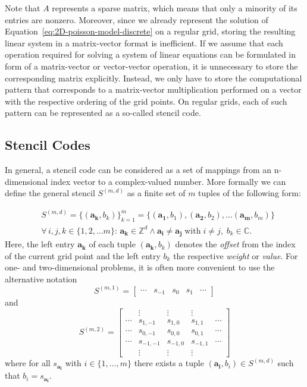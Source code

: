 Note that $A$ represents a sparse matrix, which means that only a minority of its entries are nonzero.
Moreover, since we already represent the solution of Equation~\ref{eq:2D-poisson-model-discrete} on a regular grid, storing the resulting linear system in a matrix-vector format is inefficient.
If we assume that each operation required for solving a system of linear equations can be formulated in form of a matrix-vector or vector-vector operation, it is unnecessary to store the corresponding matrix explicitly.
Instead, we only have to store the computational pattern that corresponds to a matrix-vector multiplication performed on a vector with the respective ordering of the grid points.
On regular grids, each of such pattern can be represented as a so-called stencil code.
\subsection{Stencil Codes}
\label{subsec:stencil-codes}
In general, a stencil code can be considered as a set of mappings from an n-dimensional index vector to a complex-valued number.
More formally we can define the general stencil $S^{(m,d)}$ as a finite set of $m$ tuples of the following form:

\begin{equation}
	\begin{split}
			& S^{(m, d)} = \{(\bm{a_k}, b_k) \}_{k=1}^m = \{(\bm{a_1}, b_1),  (\bm{a_2}, b_2), \dots (\bm{a_m}, b_m)\} 
	\\ & \forall \, i, j, k \in \{1, 2, \dots m \}: \,
	\bm{a_k} \in \mathbb{Z}^d \wedge \bm{a_i} \neq \bm{a_j} \; \text{with} \; i \neq j, \; b_k \in \mathbb{C}.
	\end{split}
\end{equation}
Here, the left entry $\bm{a_k}$ of each tuple $(\bm{a_k}, b_k)$ denotes the \emph{offset} from the index of the current grid point and the left entry $b_k$ the respective \emph{weight} or \emph{value}.
For one- and two-dimensional problems, it is often more convenient to use the alternative notation 
\begin{equation*}
	S^{(m, 1)} = \begin{bmatrix}
		\cdots & s_{-1} & s_{0} & s_{1} & \cdots
	\end{bmatrix}
\end{equation*}
and
\begin{equation*}
	S^{(m, 2)} = \begin{bmatrix}
		& \vdots & \vdots & \vdots & \\
		\cdots & s_{1,-1} & s_{1,0} & s_{1,1} & \cdots \\
		\cdots & s_{0,-1} & s_{0,0} & s_{0,1} & \cdots \\
		\cdots & s_{-1,-1} & s_{-1,0} & s_{-1,1} & \cdots \\
		& \vdots & \vdots & \vdots &
	\end{bmatrix}
\end{equation*}
where for all $s_{\bm{a_i}}$  with $i \in \{1, \dots, m\}$ there exists a tuple $(\bm{a_i}, b_i) \in S^{(m, d)}$ such that $b_i = s_{\bm{a_i}}$.


